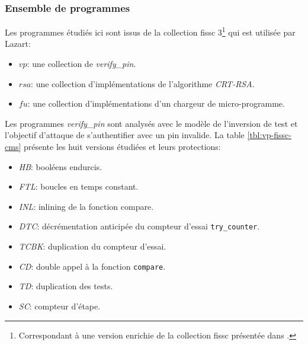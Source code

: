             \subsubsection{Ensemble de programmes}
            \label{sec:lz:exp:bench}
            
                Les programmes étudiés ici sont issus de la collection \gls{fissc} 3\footnote{Correspondant à une version enrichie de la collection \gls{fissc} présentée dans \cite{Dureuil/PPLCC16}.} qui est utilisée par Lazart: 
                \begin{itemize}
                    \item $vp$: une collection de \textit{verify\_pin}.
                    \item $rsa$: une collection d'implémentations de l'algorithme \textit{CRT-RSA}.
                    \item $fu$: une collection d'implémentations d'un chargeur de micro-programme.
                \end{itemize}
                
                Les programmes \textit{verify\_pin} sont analysés avec le modèle de l'inversion de test et l'objectif d'attaque de s'authentifier avec un \gls{pin} invalide. 
                La table \ref{tbl:vp-fissc-cms} présente les huit versions étudiées et leurs protections:
                \begin{itemize}
                    \item \textit{HB}: booléens endurcis.
                    \item \textit{FTL}: boucles en temps constant.
                    \item \textit{INL}: inlining de la fonction compare.
                    \item \textit{DTC}: décrémentation anticipée du compteur d'essai \texttt{try\_counter}.
                    \item \textit{TCBK}: duplication du compteur d'essai.
                    \item \textit{CD}: double appel à la fonction \texttt{compare}.
                    \item \textit{TD}: duplication des tests.
                    \item \textit{SC}: compteur d'étape.
                \end{itemize}
                
